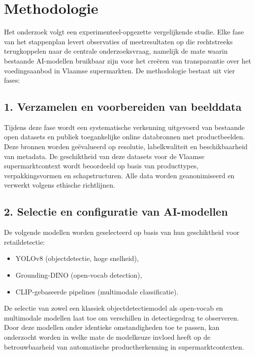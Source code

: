 
\section{Methodologie}%
\label{sec:methodologie}

Het onderzoek volgt een experimenteel-opgezette vergelijkende studie. Elke fase van het stappenplan levert observaties of meetresultaten op die rechtstreeks terugkoppelen naar de centrale onderzoeksvraag, namelijk de mate waarin bestaande AI-modellen bruikbaar zijn voor het creëren van transparantie over het voedingsaanbod in Vlaamse supermarkten. De methodologie bestaat uit vier fases:

\subsection*{1. Verzamelen en voorbereiden van beelddata}
Tijdens deze fase wordt een systematische verkenning uitgevoerd van bestaande open datasets en publiek toegankelijke online databronnen met productbeelden. Deze bronnen worden geëvalueerd op resolutie, labelkwaliteit en beschikbaarheid van metadata. De geschiktheid van deze datasets voor de Vlaamse supermarktcontext wordt beoordeeld op basis van producttypes, verpakkingsvormen en schapstructuren.
Alle data worden geanonimiseerd en verwerkt volgens ethische richtlijnen.

\subsection*{2. Selectie en configuratie van AI-modellen}
De volgende modellen worden geselecteerd op basis van hun geschiktheid voor retaildetectie:
\begin{itemize}
    \item YOLOv8 (objectdetectie, hoge snelheid),
    \item Grounding-DINO (open-vocab detection),
    \item CLIP-gebaseerde pipelines (multimodale classificatie).
\end{itemize}
De selectie van zowel een klassiek objectdetectiemodel als open-vocab en multimodale modellen laat toe om verschillen in detectiegedrag te observeren. Door deze modellen onder identieke omstandigheden toe te passen, kan onderzocht worden in welke mate de modelkeuze invloed heeft op de betrouwbaarheid van automatische productherkenning in supermarktcontexten.

